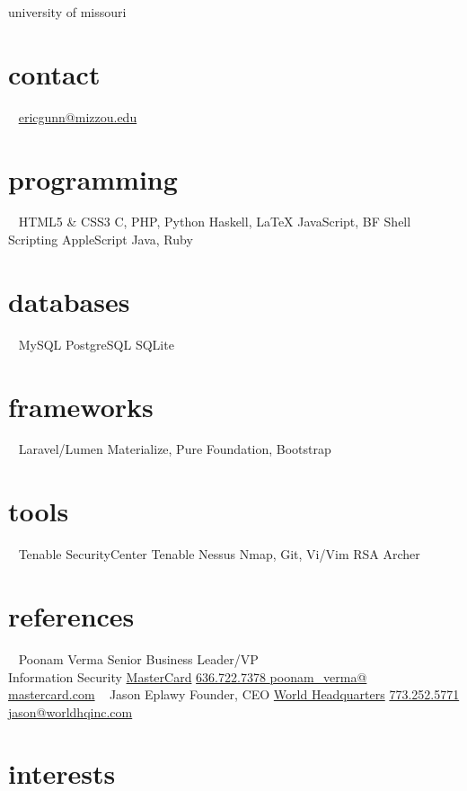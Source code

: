\documentclass[print]{gunn-resume}
\begin{document}
       {university of missouri}


\begin{aside}
  \section{contact}
  ~
    \href{mailto:ericgunn@mizzou.edu}{ericgunn@mizzou.edu}
  \section{programming}
  ~
    HTML5 \& CSS3
    C, PHP, Python
    Haskell, \LaTeX
    JavaScript, BF
    Shell Scripting
    AppleScript
    Java, Ruby
 \section{databases}
 ~
 MySQL
 PostgreSQL
 SQLite
 \section{frameworks}
 ~
 Laravel/Lumen
 Materialize, Pure
 Foundation, Bootstrap
 \section{tools}
 ~
 Tenable SecurityCenter
 Tenable Nessus
 Nmap, Git, Vi/Vim
 RSA Archer
 \section{references}
 ~
 Poonam Verma
 Senior Business Leader/VP\\ Information Security
 \href{http://mastercard.com}{MasterCard}
 \href{16367227378 }{636.722.7378 }
\href{mailto:poonam_verma@mastercard.com}{poonam\_verma@\\mastercard.com}
 ~
 Jason Eplawy
 Founder, CEO
 \href{http://worldhqinc.com}{World Headquarters}
 \href{17732525771}{773.252.5771}
\href{mailto:jason@worldhqinc.com}{jason@worldhqinc.com}
 ~
\end{aside}

\section{interests}
\end{document}
